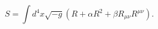 \begin{equation}\label{e4}
S=\int\!{d}^{4}x\sqrt {-g}\left( R+\alpha{R}^{2}+\beta R_{{\mu\nu}}R^{\mu\nu}\right).
\end{equation}

